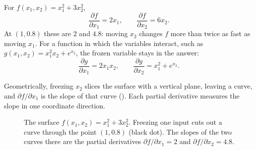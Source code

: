 \begin{example}
  \label{ex:ch02-partials}
  For $f(x_1, x_2) = x_1^2 + 3x_2^2$,
  \[
    \frac{\partial f}{\partial x_1} = 2x_1,
    \qquad
    \frac{\partial f}{\partial x_2} = 6x_2 .
  \]
  At $(1, 0.8)$ these are $2$ and $4.8$: moving $x_2$ changes $f$ more than
  twice as fast as moving $x_1$. For a function in which the variables
  interact, such as $g(x_1, x_2) = x_1^2 x_2 + e^{x_2}$, the frozen variable
  stays in the answer:
  \[
    \frac{\partial g}{\partial x_1} = 2x_1 x_2,
    \qquad
    \frac{\partial g}{\partial x_2} = x_1^2 + e^{x_2}.
  \]
\end{example}

Geometrically, freezing $x_2$ slices the surface with a vertical plane,
leaving a curve, and $\partial f / \partial x_1$ is the slope of that curve
(). Each partial derivative measures the slope in one
coordinate direction.

\begin{figure}[ht]
  \centering
  \caption{The surface $f(x_1, x_2) = x_1^2 + 3x_2^2$. Freezing one input
    cuts out a curve through the point $(1, 0.8)$ (black dot). The slopes
    of the two curves there are the partial derivatives
    $\partial f / \partial x_1 = 2$ and $\partial f / \partial x_2 = 4.8$.}
  \label{fig:ch02-slices}
\end{figure}

